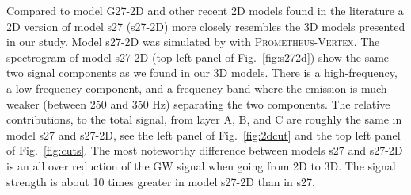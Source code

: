 {\comment
Compared to model G27-2D and other recent 2D models found in the literature \citep{marek_08,murphy_09,mueller_13}
a 2D version of model s27 (s27-2D) more closely resembles the 3D models presented in our study.
Model s27-2D was simulated by \citet{hanke_13} with \textsc{Prometheus-Vertex}.
The spectrogram of model s27-2D (top left panel of Fig.~\ref{fig:s272d}) show the same two signal components
as we found in our 3D models. There is a high-frequency, a low-frequency component, and a 
frequency band where the emission is much weaker (between 250 and 350 Hz) separating the two components.
The relative contributions, to the total signal, from layer A, B, and C are roughly the same in model s27 and
s27-2D, see the left panel of Fig.~\ref{fig:2dcut} and the top left panel of Fig.~\ref{fig:cuts}.
The most noteworthy difference between models s27 and s27-2D is an all over reduction of the GW signal when going from 2D to 3D. 
The signal strength is about 10 times greater in model s27-2D than in
s27.}

